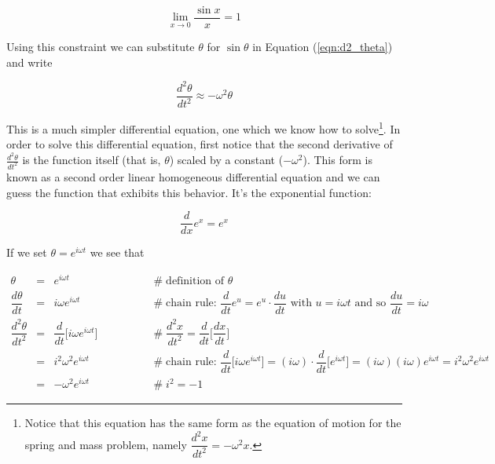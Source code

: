\documentclass{article}
\theoremstyle{definition}
\begin{document}
\medskip
\begin{equation*}
\lim_{x \to 0} \dfrac{\sin x}{x} = 1
\end{equation*}

\bigskip
\noindent
Using this constraint we can substitute $\theta$ for $\sin \theta$
in Equation (\ref{eqn:d2_theta}) and write 

\medskip
\begin{equation}
\dfrac{d^2 \theta}{dt^2} \approx - \omega^2 \theta
\label{eqn:d2_small_angle}
\end{equation}

\bigskip
\noindent
This is a much simpler differential equation, one which we know how
to solve\footnote{Notice that this equation has the same form as
the equation of motion for the spring and mass problem, namely
$\dfrac{d^2 x}{dt^2} = -\omega^2 x$.}. In order to solve this 
differential equation, first notice that the second 
derivative of $\frac{d^2 \theta}{dt^2}$ is the function
itself (that is, $\theta$) scaled by a constant ($- \omega^2$). 
This form is known as a second order linear homogeneous differential 
equation \cite{tseng_second_order} and we can guess the 
function that exhibits this behavior. It's the exponential 
function:

\bigskip
\begin{equation*}
\dfrac{d}{dx} e^x = e^x
\end{equation*}

\smallskip
\bigskip
\noindent
If we set $\theta = e^{i\omega t}$ we see that


\begin{equation*}
\begin{array}{llll}
\theta &=& e^{i\omega t}						
                &\qquad \qquad \mathrel{\#} \text{definition of $\theta$} \\
[6pt]
\dfrac{d \theta}{dt} &=& i \omega e^{i\omega t}		
                &\qquad \qquad \mathrel{\#} \text{chain rule:
                $\dfrac{d}{dt}
                e^u = e^u \cdot \dfrac{du}{dt}$ with $u
                = i \omega t$ and so $\dfrac{du}{dt} = i \omega$} \\
[12pt]
\dfrac{d^2 \theta}{dt^2} 
&=& \dfrac{d}{dt} \Big [ i \omega e^{i\omega t} \Big ]	
		&\qquad \qquad \mathrel{\#} \dfrac{d^2 x}{dt^2} = \dfrac{d}{dt} \bigg [ \dfrac{dx}{dt} \bigg ] \\
[12pt]
&=& i^2 \omega^2 e^{i\omega t}						
		&\qquad \qquad \mathrel{\#} \text{chain rule: 
		$\dfrac{d}{dt} \Big [ i \omega e^{i\omega t} \Big ] = (i \omega) \cdot \dfrac{d}{dt} \Big [e^{i\omega t} \Big ]
		= (i \omega)(i \omega) e^{i\omega t}
		= i^2\omega^2 e^{i\omega t}$} \\
[6pt]
&=& - \omega^2 e^{i\omega t}						
		&\qquad \qquad \mathrel{\#} i^2 = -1 
\end{array}
\end{equation*}
\end{document}

